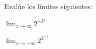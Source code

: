 \item Evalúe los límites siguientes: 
\begin{enumerate}
    \begin{minipage}{0.45\textwidth}
    \item[(a)] $\displaystyle \lim_{x \to \infty} 2^{-3^x}$
    \end{minipage}%
    \begin{minipage}{0.45\textwidth}
    \item[(b)] $\displaystyle \lim_{x \to -\infty} 2^{3^{-x}}$
    \end{minipage}
\end{enumerate}
